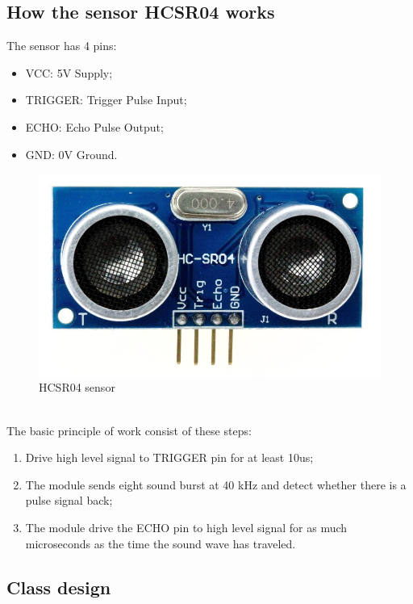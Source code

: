 \subsection{How the sensor HCSR04 works}
\begin{minipage}{0.5\textwidth}
The sensor has 4 pins:
\begin{itemize}
\item VCC: 5V Supply; 
\item TRIGGER: Trigger Pulse Input;
\item ECHO: Echo Pulse Output;
\item GND: 0V Ground.
\end{itemize} 
\end{minipage}
\begin{minipage}{0.4\textwidth}
\begin{figure}[H]
\includegraphics[width=\textwidth]{figures/raster/HCSR04}
\caption{\label{fig:sensor} HCSR04 sensor}
\end{figure}


\end{minipage} \hfill \\[1cm]



The basic principle of work consist of these steps:
\begin{enumerate}
\item Drive high level signal to TRIGGER pin for at least 10us;
\item The module sends eight sound burst  at 40 kHz and detect whether there is a
pulse signal back;
\item The module drive the ECHO pin to high level signal for as much microseconds as the time the sound wave has traveled. 
\end{enumerate} 
\subsection{Class design}
